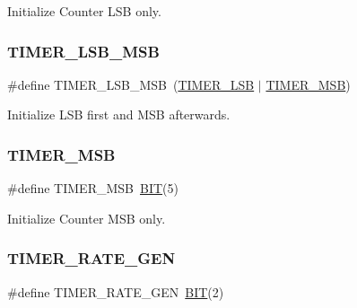 Initialize Counter L\+SB only. 

\mbox{\label{group__i8254_ga8c0f1933323274c765e23837e4fbc8c7}} 
\subsubsection{\texorpdfstring{T\+I\+M\+E\+R\+\_\+\+L\+S\+B\+\_\+\+M\+SB}{TIMER\_LSB\_MSB}}
{\footnotesize\ttfamily \#define T\+I\+M\+E\+R\+\_\+\+L\+S\+B\+\_\+\+M\+SB~(\mbox{\hyperlink{group__i8254_gac18cb814ebd0d67235392c330e0e3504}{T\+I\+M\+E\+R\+\_\+\+L\+SB}} $\vert$ \mbox{\hyperlink{group__i8254_ga2a8a6d363c612d756cd8d78480f7cd04}{T\+I\+M\+E\+R\+\_\+\+M\+SB}})}



Initialize L\+SB first and M\+SB afterwards. 

\mbox{\label{group__i8254_ga2a8a6d363c612d756cd8d78480f7cd04}} 
\subsubsection{\texorpdfstring{T\+I\+M\+E\+R\+\_\+\+M\+SB}{TIMER\_MSB}}
{\footnotesize\ttfamily \#define T\+I\+M\+E\+R\+\_\+\+M\+SB~\mbox{\hyperlink{group__vbe_ga3a8ea58898cb58fc96013383d39f482c}{B\+IT}}(5)}



Initialize Counter M\+SB only. 

\mbox{\label{group__i8254_ga5d4449e0fa1cf4a4d107a48a04a1265f}} 
\subsubsection{\texorpdfstring{T\+I\+M\+E\+R\+\_\+\+R\+A\+T\+E\+\_\+\+G\+EN}{TIMER\_RATE\_GEN}}
{\footnotesize\ttfamily \#define T\+I\+M\+E\+R\+\_\+\+R\+A\+T\+E\+\_\+\+G\+EN~\mbox{\hyperlink{group__vbe_ga3a8ea58898cb58fc96013383d39f482c}{B\+IT}}(2)}



